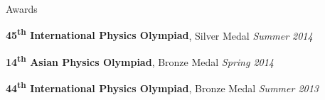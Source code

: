 \documentclass{resume}
\begin{document}

\begin{area}{Awards}
    \item \textbf{45\textsuperscript{th} International Physics Olympiad}, Silver Medal \hfill \emph{Summer 2014}
    \item \textbf{14\textsuperscript{th} Asian Physics Olympiad}, Bronze Medal \hfill \emph{Spring 2014}
    \item \textbf{44\textsuperscript{th} International Physics Olympiad}, Bronze Medal \hfill \emph{Summer 2013}
\end{area}
\end{document}

